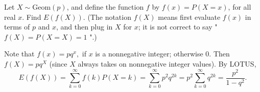 
\setcounter{theorem}{28}
\begin{exercise} [BH.4.29] Let $X \sim ${Geom}$(p)$, and define the function $f$ by $f(x)=P(X=x)$, for all real $x$. Find $E(f(X))$. (The notation $f(X)$ means first evaluate $f(x)$ in terms of $p$ and $x$, and then plug in $X$ for $x$; it is not correct to say " $f(X)=P(X=X)=1$ ".)
\begin{solution}
    Note that $f(x)=p q^x,$  { if } $x$   { is a nonnegative integer; } otherwise 0.
	Then $f(X)=p q^X$ (since $X$ always takes on nonnegative integer values). By LOTUS,
	$$
	E(f(X))=\sum_{k=0}^{\infty} f(k) P(X=k)=\sum_{k=0}^{\infty} p^2 q^{2 k}=p^2 \sum_{k=0}^{\infty} q^{2 k}= \frac{p^2}{1-q^2}.
	$$
\end{solution}
\end{exercise}


